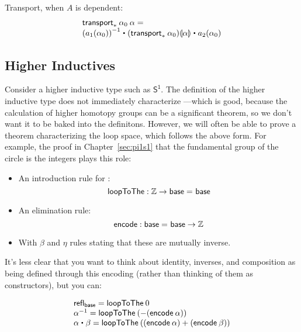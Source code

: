 Transport, when $A$ is dependent:
\[
\begin{array}{l}
\transport{x_0:A_0 \mapsto \id[A(x_0)] {a_1(x_0)}{a_2(x_0)}} {\alpha_0} \: {\alpha} = \\
\opp{(\map{a_1}{\alpha_0})} \ct \mapdep{(\transport{A}{\alpha_0})}{\alpha} \ct \map{a_2}{\alpha_0}
\end{array}
\]

\subsection{Higher Inductives}

\newcommand{\sone}{\mathsf{S^1}}

Consider a higher inductive type such as $\sone$.  The definition of the
higher inductive type does not immediately characterize
\id[\sone]{x}{y}---which is good, because the calculation of higher
homotopy groups can be a significant theorem, so we don't want it to be
baked into the definitons.  However, we will often be able to prove a
theorem characterizing the loop space, which follows the above form.
For example, the proof in Chapter~\ref{sec:pi1s1} that the fundamental
group of the circle is the integers plays this role:

\begin{itemize}
\item An introduction rule for \id[\sone]{\mathsf{base}}{\mathsf{base}}:
  \[
  \mathsf{loopToThe} : \mathbb{Z} \to \mathsf{base} =_{} \mathsf{base}
  \]
\item An elimination rule:
  \[
  \mathsf{encode} : \mathsf{base} =_{} \mathsf{base} \to \mathbb{Z}
  \]
\item With $\beta$ and $\eta$ rules stating that these are mutually inverse.
\end{itemize}

It's less clear that you want to think about identity, inverses, and
composition as being defined through this encoding (rather than thinking
of them as constructors), but you can:

\[
\begin{array}{l}
\refl{\mathsf{base}} = \mathsf{loopToThe} \: 0 \\
\opp{\alpha} = \mathsf{loopToThe} \: (- (\mathsf{encode} \: \alpha)) \\
\alpha \ct \beta = \mathsf{loopToThe} \: ((\mathsf{encode} \: \alpha) + (\mathsf{encode} \: \beta)) \\
\end{array}
\]

